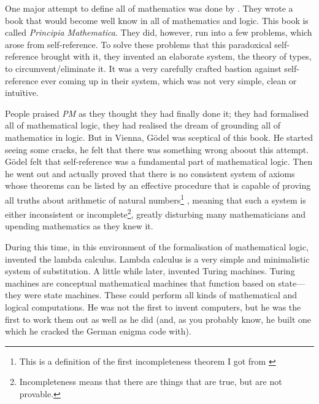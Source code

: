 \documentclass[11pt]{article}
\begin{document}
One major attempt to define all of mathematics was done by
\textcite{russell1997}. They wrote a book that would become well know in all of
mathematics and logic. This book is called \emph{Principia Mathematica}. They
did, however, run into a few problems, which arose from self-reference. To
solve these problems that this paradoxical self-reference brought with it, they
invented an elaborate system, the theory of types, to circumvent/eliminate it.
It was a very carefully crafted bastion against self-reference ever coming up
in their system, which was not very simple, clean or intuïtive.

People praised \emph{PM} as they thought they had finally done it; they had
formalised all of mathematical logic, they had realised the dream of grounding
all of mathematics in logic. But in Vienna, Gödel was sceptical of this book.
He started seeing some cracks, he felt that there was something wrong aboout
this attempt. Gödel felt that self-reference was a fundamental part of
mathematical logic. Then he went out and actually proved that there is no
consistent system of axioms whose theorems can be listed by an effective
procedure that is capable of proving all truths about arithmetic of natural
numbers\footnote{This is a definition of the first incompleteness theorem I got
from \textcite{wiki:Incompleteness_theorems}} \parencite{godel1931}, meaning
that such a system is either inconsistent or incomplete\footnote{Incompleteness
means that there are things that are true, but are not provable.}, greatly
disturbing many mathematicians and upending mathematics as they knew it.

During this time, in this environment of the formalisation of mathematical
logic, \textcite{church1932} invented the lambda calculus. Lambda calculus is a
very simple and minimalistic system of substitution. A little while later,
\textcite{turing1936, turing1937correction} invented Turing machines. Turing
machines are conceptual mathematical machines that function based on
state---they were state machines. These could perform all kinds of mathematical
and logical computations. He was not the first to invent computers, but he was
the first to work them out as well as he did (and, as you probably know, he
built one which he cracked the German enigma code with).
\end{document}
